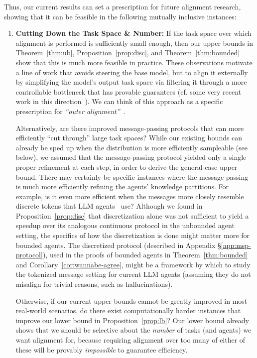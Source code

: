 Thus, our current results can set a prescription for future alignment research, showing that it can be feasible in the following mutually inclusive instances:
\begin{enumerate}
\item \textbf{Cutting Down the Task Space \& Number:} If the task space over which alignment is performed is sufficiently small enough, then our upper bounds in Theorem~\ref{thm:ub}, Proposition~\ref{prop:disc}, and Theorem~\ref{thm:bounded} show that this is much more feasible in practice.
These observations motivate a line of work that avoids steering the base model, but to align it externally by simplifying the model's output task space via filtering it through a more controllable bottleneck that has provable guarantees (cf. some very recent work in this direction~\citep{pfrommer2023power,block2024provable}).
We can think of this approach as a specific prescription for \emph{``outer alignment''}~\citep{christiano2019,hubinger2019risks,ngo2022alignment}.

\par\hspace*{1.5em} Alternatively, are there improved message-passing protocols that can more efficiently ``cut through'' large task spaces?
While our existing bounds can already be sped up when the distribution is more efficiently sampleable (see below), we assumed that the message-passing protocol yielded only a single proper refinement at each step, in order to derive the general-case upper bound.
There may certainly be specific instances where the message passing is much more efficiently refining the agents' knowledge partitions.
For example, is it even more efficient when the messages more closely resemble discrete tokens that LLM agents~\citep{wang2024survey} use?
Although we found in Proposition~\ref{prop:disc} that discretization alone was not sufficient to yield a speedup over its analogous continuous protocol in the unbounded agent setting, the specifics of how the discretization is done might matter more for bounded agents.
The discretized protocol (described in Appendix \S\ref{app:msp-protocol}), used in the proofs of bounded agents in Theorem~\ref{thm:bounded} and Corollary~\ref{cor:wannabe-agree}, might be a framework by which to study the tokenized message setting for current LLM agents (assuming they do not misalign for trivial reasons, such as hallucinations).

\par\hspace*{1.5em}
Otherwise, if our current upper bounds cannot be greatly improved in most real-world scenarios, do there exist computationally harder instances that improve our lower bound in Proposition~\ref{prop:lb}?
Our lower bound already shows that we should be selective about the \emph{number} of tasks (and agents) we want alignment for, because requiring alignment over too many of either of these will be provably \emph{impossible} to guarantee efficiency.


\end{enumerate}
